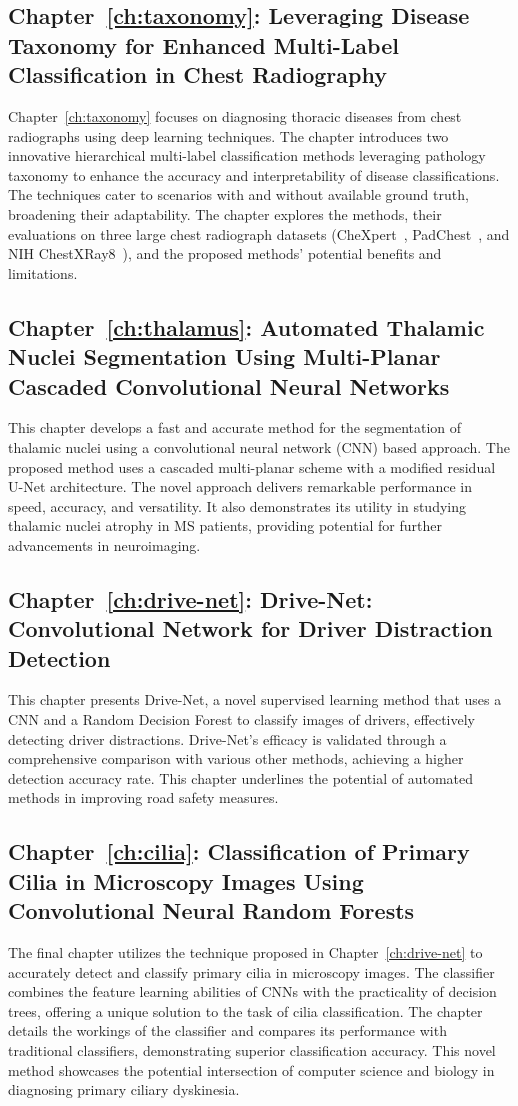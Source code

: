 \subsection*{Chapter~\ref{ch:taxonomy}: Leveraging Disease Taxonomy for Enhanced Multi-Label Classification in Chest Radiography}
Chapter~\ref{ch:taxonomy} focuses on diagnosing thoracic diseases from chest radiographs using deep learning techniques. The chapter introduces two innovative hierarchical multi-label classification methods leveraging pathology taxonomy to enhance the accuracy and interpretability of disease classifications. The techniques cater to scenarios with and without available ground truth, broadening their adaptability. The chapter explores the methods, their evaluations on three large chest radiograph datasets (CheXpert~\cite{irvin_CheXpert_2019}, PadChest~\cite{bustos_Padchest_2020}, and NIH ChestXRay8~\cite{wang_ChestXRay8_2017}), and the proposed methods' potential benefits and limitations.
\subsection*{Chapter~\ref{ch:thalamus}: Automated Thalamic Nuclei Segmentation Using Multi-Planar Cascaded Convolutional Neural Networks}
This chapter develops a fast and accurate method for the segmentation of thalamic nuclei using a convolutional neural network (CNN) based approach. The proposed method uses a cascaded multi-planar scheme with a modified residual U-Net architecture. The novel approach delivers remarkable performance in speed, accuracy, and versatility. It also demonstrates its utility in studying thalamic nuclei atrophy in MS patients, providing potential for further advancements in neuroimaging.
\subsection*{Chapter~\ref{ch:drive-net}: Drive-Net: Convolutional Network for Driver Distraction Detection} This chapter presents Drive-Net, a novel supervised learning method that uses a CNN and a Random Decision Forest to classify images of drivers, effectively detecting driver distractions. Drive-Net's efficacy is validated through a comprehensive comparison with various other methods, achieving a higher detection accuracy rate. This chapter underlines the potential of automated methods in improving road safety measures.
\subsection*{Chapter~\ref{ch:cilia}: Classification of Primary Cilia in Microscopy Images Using Convolutional Neural Random Forests}
The final chapter utilizes the technique proposed in Chapter~\ref{ch:drive-net} to accurately detect and classify primary cilia in microscopy images. The classifier combines the feature learning abilities of CNNs with the practicality of decision trees, offering a unique solution to the task of cilia classification. The chapter details the workings of the classifier and compares its performance with traditional classifiers, demonstrating superior classification accuracy. This novel method showcases the potential intersection of computer science and biology in diagnosing primary ciliary dyskinesia.
